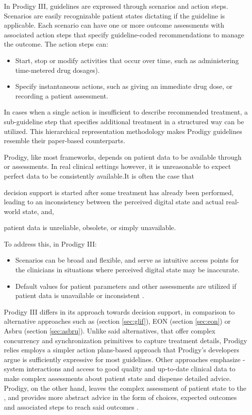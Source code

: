 In Prodigy III, guidelines are expressed through scenarios and action steps.
Scenarios are easily recognizable patient states dictating if the guideline
is applicable. Each scenario can have one or more outcome assessments with
associated action steps that specify guideline-coded recommendations to manage
the outcome. The action steps can:
\begin{itemize}
  \item Start, stop or modify activities that occur over time, such as
    administering time-metered drug dosages).
  \item Specify instantaneous actions, such as giving an immediate drug dose,
    or recording a patient assessment.
\end{itemize}
In cases when a single action is insufficient to describe recommended treatment,
a sub-guideline step that specifies additional treatment in a structured way
can be utilized. This hierarchical representation methodology makes Prodigy
guidelines resemble their paper-based counterparts.

Prodigy, like most \CDSSs{} frameworks, depends on patient data to
be available through \EHRs{} or \HCP{} assessments. In real clinical settings
however, it is unreasonable to expect perfect data to be consistently
available.It is often the case that
\begin{enumerate*}[label=(\alph*)]
  \item decision support is started after some treatment has already
    been performed, leading to an inconsistency between the perceived
    digital state and actual real-world state, and,
  \item patient data is unreliable, obsolete, or simply unavailable.
\end{enumerate*}
To address this, in Prodigy III:
\begin{itemize}
  \item Scenarios can be broad and flexible, and serve as intuitive access points for
    the clinicians in situations where perceived digital state may be
    inaccurate.
  \item Default values for patient parameters and other assessments are utilized
    if patient data is unavailable or inconsistent \cite{JohnsonAMIA00}.
\end{itemize}

Prodigy III differs in its approach towards decision support, in comparison
to alternative approaches such as \GLIF{} (section \ref{sec:glif}), EON (section
\ref{sec:eon}) or Asbru (section \ref{sec:asbru}). Unlike said alternatives,
that offer complex concurrency and synchronization primitives to capture
treatment details, Prodigy relies employs a simpler action plans-based approach
that Prodigy's developers argue is sufficiently expressive for most guidelines.
Other approaches emphasize \HCP{}-system interactions and access to good quality
and up-to-date clinical data to make complex assessments about patient state and dispense detailed
advice. Prodigy, on the other hand, leaves the complex assessment of patient
state to the \HCP{}, and provides more abstract advice in the form of choices,
expected outcomes and associated steps to reach said outcomes \cite{JohnsonAMIA00}.

